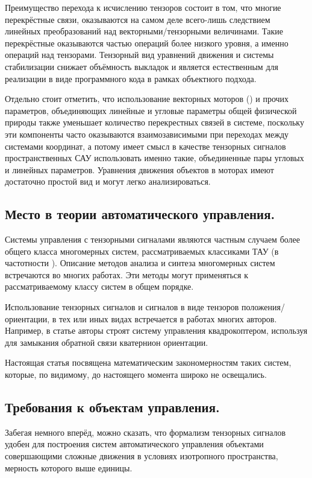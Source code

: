 \documentclass[a4paper]{article}
\begin{document}
Преимущество перехода к исчислению тензоров состоит в том, что многие перекрёстные связи, оказываются на самом деле всего-лишь следствием линейных преобразований над векторными/тензорными величинами. Такие перекрёстные оказываются частью операций более низкого уровня, а именно операций над тензорами. Тензорный вид уравнений движения и системы стабилизации снижает объёмность выкладок и является естественным для реализации в виде программного кода в рамках объектного подхода. 

Отдельно стоит отметить, что использование векторных моторов (\cite{motor}) и прочих параметров, объединяющих линейные и угловые параметры общей физической природы также уменьшает количество перекрестных связей в системе, поскольку эти компоненты часто оказываются взаимозависимыми при переходах между системами координат, а потому имеет смысл в качестве тензорных сигналов пространственных САУ использовать именно такие, объединенные пары угловых и линейных параметров. Уравнения движения объектов в моторах имеют достаточно простой вид и могут легко анализироваться.

\subsection{Место в теории автоматического управления.}
Системы управления с тензорными сигналами являются частным случаем более общего класса многомерных систем, рассматриваемых классиками ТАУ (в частотности \cite{tau}). Описание методов анализа и синтеза многомерных систем встречаются во многих работах. Эти методы могут применяться к рассматриваемому классу систем в общем порядке. 

Использование тензорных сигналов и сигналов в виде тензоров положения/ориентации, в тех или иных видах встречается в работах многих авторов. Например, в статье \cite{quadrotor} авторы строят систему управления квадрокоптером, используя для замыкания обратной связи кватернион ориентации. 

Настоящая статья посвящена математическим закономерностям таких систем, которые, по видимому, до настоящего момента широко не освещались.

\subsection{Требования к объектам управления.}
Забегая немного вперёд, можно сказать, что формализм тензорных сигналов удобен для построения систем автоматического управления объектами совершающими сложные движения в условиях изотропного пространства, мерность которого выше единицы.
\end{document}
